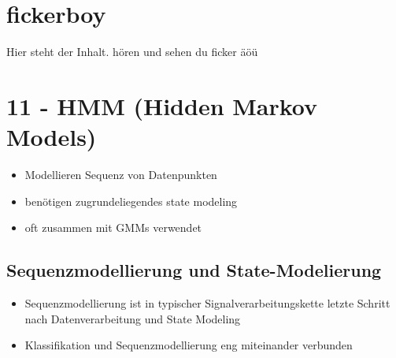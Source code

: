 \documentclass[a4paper,10pt,oneside]{article}
\begin{document}
\tableofcontents
 
\section{fickerboy}
Hier steht der Inhalt.
hören und sehen du ficker
äöü

\section{11 - HMM (Hidden Markov Models)}
	\begin{itemize}
		\item Modellieren Sequenz von Datenpunkten
		\item benötigen zugrundeliegendes state modeling
		\item oft zusammen mit GMMs verwendet
	\end{itemize}
	
\subsection{Sequenzmodellierung und State-Modelierung}
	\begin{itemize}
		\item Sequenzmodellierung ist in typischer Signalverarbeitungskette letzte Schritt nach Datenverarbeitung und State Modeling 
		\item Klassifikation und Sequenzmodellierung eng miteinander verbunden
	\end{itemize}
\end{document}
